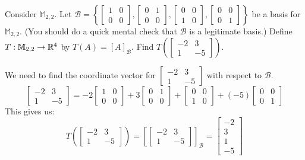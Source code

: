 \documentclass{ximera}
\begin{document}
\begin{example}\label{ex:abstvectsplintranscoordvect1}
Consider $\mathbb{M}_{2,2}$.  Let $\mathcal{B}=\left\{\begin{bmatrix}1&0\\0&0\end{bmatrix}, \begin{bmatrix}0&1\\0&0\end{bmatrix}, \begin{bmatrix}0&0\\1&0\end{bmatrix}, \begin{bmatrix}0&0\\0&1\end{bmatrix}\right\}$ be a basis for $\mathbb{M}_{2,2}$.  (You should do a quick mental check that $\mathcal{B}$ is a legitimate basis.)  Define $T:\mathbb{M}_{2,2}\rightarrow \mathbb{R}^4$ by $T(A)=[A]_{\mathcal{B}}$.  Find $T\left(\begin{bmatrix}-2&3\\1&-5\end{bmatrix}\right)$.
\begin{explanation}
We need to find the coordinate vector for $\begin{bmatrix}-2&3\\1&-5\end{bmatrix}$ with respect to $\mathcal{B}$.
$$\begin{bmatrix}-2&3\\1&-5\end{bmatrix}=-2\begin{bmatrix}1&0\\0&0\end{bmatrix}+ 3\begin{bmatrix}0&1\\0&0\end{bmatrix}+ \begin{bmatrix}0&0\\1&0\end{bmatrix}+ (-5)\begin{bmatrix}0&0\\0&1\end{bmatrix}$$
This gives us:
$$T\left(\begin{bmatrix}-2&3\\1&-5\end{bmatrix}\right)=\left[\begin{bmatrix}-2&3\\1&-5\end{bmatrix}\right]_{\mathcal{B}}=\begin{bmatrix}-2\\3\\1\\-5\end{bmatrix}$$
\end{explanation}
\end{example}
\end{document}
